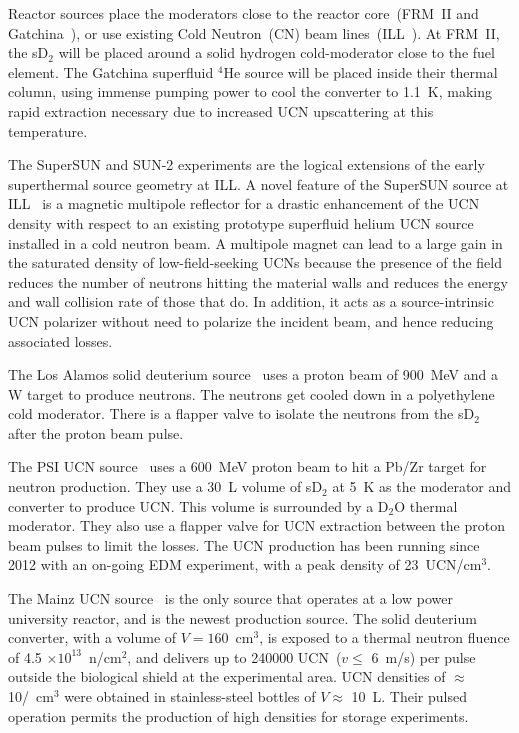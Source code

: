 Reactor sources place the moderators close to the reactor core~(FRM~II
and Gatchina~\cite{Serebrov_ascona}), or use existing Cold
Neutron~(CN) beam lines~(ILL~\cite{Piegsa2014}). At FRM~II, the sD$_2$
will be placed around a solid hydrogen cold-moderator close to the
fuel element. The Gatchina superfluid $^4$He source will be placed
inside their thermal column, using immense pumping power to cool the
converter to 1.1~K, making rapid extraction necessary due to increased
UCN upscattering at this temperature.

The SuperSUN and SUN-2 experiments are the logical extensions of the
early superthermal source geometry at ILL.  A novel feature of the
SuperSUN source at ILL~\cite{Zimmer2015} is a magnetic multipole
reflector for a drastic enhancement of the UCN density with respect to
an existing prototype superfluid helium UCN source installed in a cold
neutron beam. A multipole magnet can lead to a large gain in the
saturated density of low-field-seeking UCNs because the presence of
the field reduces the number of neutrons hitting the material walls
and reduces the energy and wall collision rate of those that do. In
addition, it acts as a source-intrinsic UCN polarizer without need to
polarize the incident beam, and hence reducing associated losses.

The Los Alamos solid deuterium source~\cite{Ito_ascona} uses a proton
beam of 900~MeV and a W target to produce neutrons. The neutrons get
cooled down in a polyethylene cold moderator. There is a flapper valve
to isolate the neutrons from the sD$_2$ after the proton beam pulse.

The PSI UCN source~\cite{Ries_ascona} uses a 600~MeV proton beam to
hit a Pb/Zr target for neutron production. They use a 30~L volume of
sD$_2$ at 5~K as the moderator and converter to produce UCN. This
volume is surrounded by a D$_2$O thermal moderator. They also use a
flapper valve for UCN extraction between the proton beam pulses to
limit the losses. The UCN production has been running since 2012 with
an on-going EDM experiment, with a peak density of 23~UCN/cm$^3$.

The Mainz UCN source~\cite{Karch2014} is the only source that operates
at a low power university reactor, and is the newest production
source. The solid deuterium converter, with a volume of
$V = 160$~cm$^3$, is exposed to a thermal neutron fluence of 4.5
$\times 10^{13}$~n/cm$^2$, and delivers up to 240000 UCN~($v \leq$
6~m/s) per pulse outside the biological shield at the experimental
area. UCN densities of $\approx$ 10/~cm$^3$ were obtained in
stainless-steel bottles of $V \approx$ 10~L. Their pulsed operation
permits the production of high densities for storage experiments.

